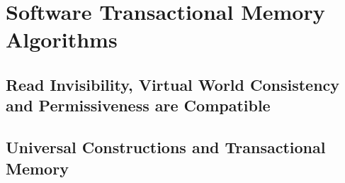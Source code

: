 \documentclass[11pt]{book}
\begin{document}
\part{Software Transactional Memory Algorithms}

\chapter{Read Invisibility, Virtual World Consistency and Permissiveness are Compatible}
\label{chap:VWC}



\chapter{Universal Constructions and Transactional Memory}
\label{chap:UC}
%

\end{document}
